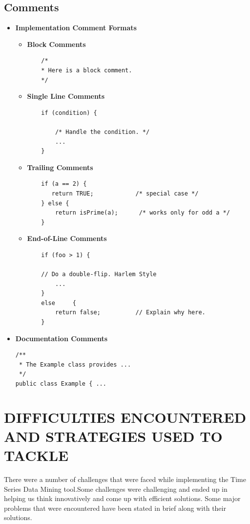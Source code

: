 \documentclass[12pt]{report}
\begin{document}
\subsection{Comments}
\begin{itemize}
\item{\textbf{Implementation Comment Formats}}
	\begin{itemize}
	\item \textbf{Block Comments}
	\begin{verbatim}
	/*
 	* Here is a block comment.
 	*/
	\end{verbatim}
	\item \textbf{Single Line Comments}
	\begin{verbatim}
	if (condition) {

    	/* Handle the condition. */
    	...
	}

	\end{verbatim}
	\item \textbf{Trailing Comments}
	\begin{verbatim}
	if (a == 2) {
 	   return TRUE;            /* special case */
	} else {
	    return isPrime(a);      /* works only for odd a */
	}
	\end{verbatim}
	\item \textbf{End-of-Line Comments}
	\begin{verbatim}
	if (foo > 1) {

    // Do a double-flip. Harlem Style
    	...
	}
	else	 {
    	return false;          // Explain why here.	
	}
	\end{verbatim}
	\end{itemize}
\item{\textbf{Documentation Comments}}
\begin{verbatim}
/**
 * The Example class provides ...
 */
public class Example { ...
\end{verbatim}

\end{itemize}
\section{DIFFICULTIES ENCOUNTERED AND STRATEGIES USED TO TACKLE}

\paragraph{}There were a number of challenges that were faced while implementing the Time Series Data Mining tool.Some challenges were challenging and ended up in helping us think innovatively and come up with efficient solutions. Some major problems that were encountered have been stated in brief along with their solutions.
\end{document}
